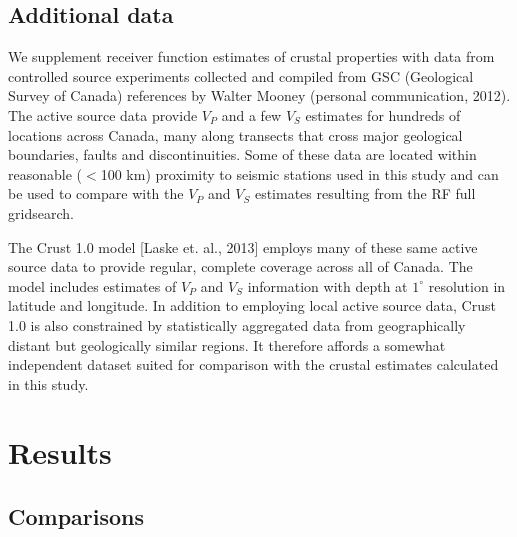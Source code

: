 \documentclass[draft, 12pt]{article}
\begin{document}
\subsection{Additional data}

We supplement receiver function estimates of crustal properties with data from controlled source experiments collected and compiled from GSC (Geological Survey of Canada) references by Walter Mooney (personal communication, 2012). The active source data provide $V_P$ and a few $V_S$ estimates for hundreds of locations across Canada, many along transects that cross major geological boundaries, faults and discontinuities. Some of these data are located within reasonable ($<$100 km) proximity to seismic stations used in this study and can be used to compare with the $V_P$ and $V_S$ estimates resulting from the RF full gridsearch.

The Crust 1.0 model [Laske et. al., 2013] employs many of these same active source data to provide regular, complete coverage across all of Canada. The model includes estimates of $V_P$ and $V_S$ information with depth at $1^\circ$ resolution in latitude and longitude. In addition to employing local active source data, Crust 1.0 is also constrained by statistically aggregated data from geographically distant but geologically similar regions. It therefore affords a somewhat independent dataset suited for comparison with the crustal estimates calculated in this study.







\section{Results}


\subsection{Comparisons}
\end{document}
